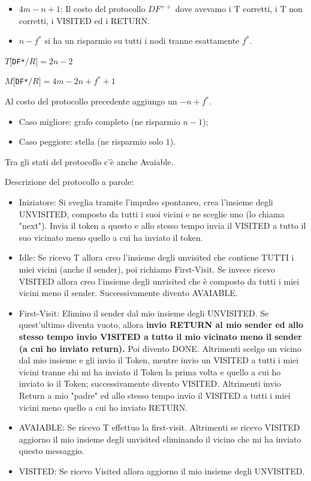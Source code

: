 \begin{itemize}
    \item $ 4m - n + 1$: Il costo del protocollo $DF^{++}$ dove avevamo i T corretti, i T non corretti, i VISITED ed i RETURN.
    \item $n-f^*$ si ha un risparmio su tutti i nodi tranne esattamente $f^*$.
\end{itemize}
\begin{center}
  $T[$\texttt{DF*}$/R] = 2n - 2$
\end{center}
\begin{center}
  $M[$\texttt{DF*}$/R] = 4m - 2n + f^* + 1$
\end{center}
Al costo del protocollo precedente aggiungo un $-n+f^*$.
\begin{itemize}
  \item Caso migliore: grafo completo (ne risparmio $n-1$);
  \item Caso peggiore: stella (ne risparmio solo $1$).
\end{itemize}
Tra gli stati del protocollo c'è anche Avaiable.

Descrizione del protocollo a parole:
\begin{itemize}
    \item Iniziatore: Si sveglia tramite l'impulso spontaneo, crea l'insieme degli UNVISITED, composto da tutti i suoi vicini e ne sceglie uno (lo chiama "next"). Invia il token a questo e allo stesso tempo invia il  VISITED a tutto il suo vicinato meno quello a cui ha inviato il token.
    \item Idle: Se ricevo T allora creo l'insieme degli unvisited che contiene TUTTI i miei vicini (anche il sender), poi richiamo First-Visit.
    Se invece ricevo VISITED allora creo l'insieme degli unvisited che è composto da tutti i miei vicini meno il sender. Successivamente divento AVAIABLE.
    \item First-Visit: Elimino il sender dal mio insieme degli UNVISITED. Se quest'ultimo diventa vuoto, allora \textbf{invio RETURN al mio sender ed allo stesso tempo invio VISITED a tutto il mio vicinato meno il sender (a cui ho inviato return).} Poi divento DONE. Altrimenti scelgo un vicino dal mio insieme e gli invio il Token, mentre invio un VISITED a tutti i miei vicini tranne chi mi ha inviato il Token la prima volta e quello a cui ho inviato io il Token; successivamente divento VISITED. Altrimenti invio Return a mio "padre" ed allo stesso tempo invio il VISITED a tutti i miei vicini meno quello a cui ho inviato RETURN.
    \item AVAIABLE: Se ricevo T effettuo la first-visit. Altrimenti se ricevo VISITED aggiorno il mio insieme degli unvisited eliminando il vicino che mi ha inviato questo messaggio.
    \item VISITED: Se ricevo Visited allora aggiorno il mio insieme degli UNVISITED.
\end{itemize}


